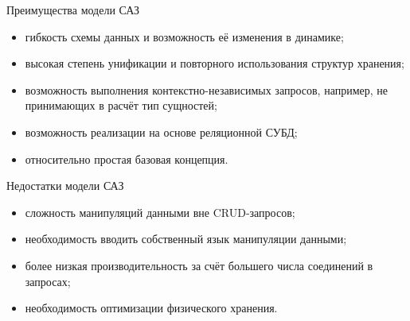 \documentclass{beamer}
\begin{document}
\begin{frame} 
\begin{block}{Преимущества модели САЗ}
\begin{itemize}
\item гибкость схемы данных и возможность её изменения в динамике;
\item высокая степень унификации и повторного использования структур хранения;
\item возможность выполнения контекстно-независимых запросов, например, не принимающих в расчёт тип сущностей;
\item возможность реализации на основе реляционной СУБД;
\item относительно простая базовая концепция.
\end{itemize}
\end{block}
\begin{block}{Недостатки модели САЗ}
\begin{itemize}
\item сложность манипуляций данными вне CRUD-запросов;
\item необходимость вводить собственный язык манипуляции данными;
\item более низкая производительность за счёт большего числа соединений в запросах;
\item необходимость оптимизации физического хранения.
\end{itemize}
\end{block}
\end{frame} 
\end{document}
